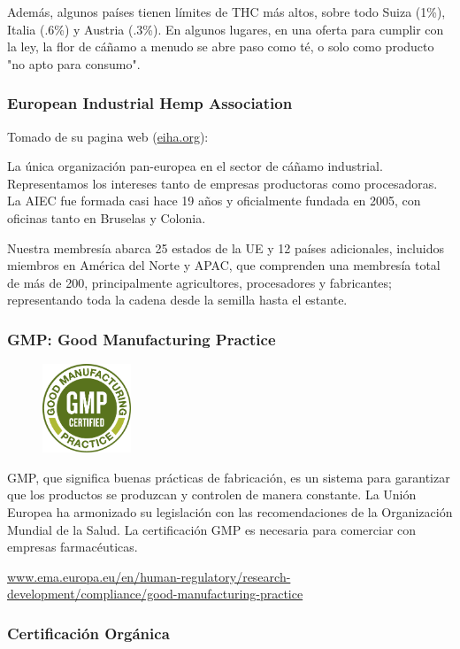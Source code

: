 \documentclass{article}
\begin{document}
Además, algunos países tienen límites de THC más altos, sobre todo Suiza (1\%), Italia (.6\%) y Austria (.3\%). En algunos lugares, en una oferta para cumplir con la ley, la flor de cáñamo a menudo se abre paso como té, o solo como producto "no apto para consumo".

\subsubsection{European Industrial Hemp Association}

Tomado de su pagina web (\url{eiha.org}):

La única organización pan-europea en el sector de cáñamo industrial. Representamos los intereses tanto  de empresas productoras como procesadoras. La AIEC fue formada casi hace 19 años y oficialmente fundada en 2005, con oficinas tanto en Bruselas y Colonia.

Nuestra membresía abarca 25 estados de la UE y 12 países adicionales, incluidos miembros en América del Norte y APAC, que comprenden una membresía total de más de 200, principalmente agricultores, procesadores y fabricantes; representando toda la cadena desde la semilla hasta el estante.

\subsubsection{GMP: Good Manufacturing Practice}

\begin{figure}[H]
	\includegraphics[width=100px]{res/eu-gmp.png}
	\label{fig:eugmp}
\end{figure}

GMP, que significa buenas prácticas de fabricación, es un sistema para garantizar que los productos se produzcan y controlen de manera constante. La Unión Europea ha armonizado su legislación con las recomendaciones de la Organización Mundial de la Salud. La certificación GMP es necesaria para comerciar con empresas farmacéuticas.

\url{www.ema.europa.eu/en/human-regulatory/research-development/compliance/good-manufacturing-practice}

\subsubsection{Certificación Orgánica}
\end{document}
